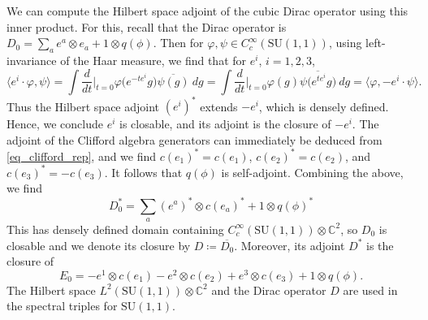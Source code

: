 \documentclass{amsart}
\theoremstyle{definition}
\theoremstyle{remark}
\numberwithin{equation}{section}
\begin{document}
We can compute the Hilbert space adjoint of the cubic Dirac operator using this inner product. For this, recall that the Dirac operator is $D_0=\sum_{a}e^a\otimes e_a+1\otimes q(\phi)$. Then for $\varphi,\psi\in C_c^\infty(\mathrm{SU}(1,1))$, using left-invariance of the Haar measure, we find that for $e^i$, $i=1,2,3$,
\begin{equation*}
    \langle e^i\cdot\varphi,\psi\rangle=\int \frac{d}{dt}\bigg|_{t=0}\varphi\big(e^{-te^i}g\big)\overline{\psi(g)}\ dg=\int\frac{d}{dt}\bigg|_{t=0}\varphi(g)\overline{\psi\big(e^{te^i}g\big)}\ dg=\langle\varphi,-e^i\cdot\psi\rangle.
\end{equation*}
Thus the Hilbert space adjoint $(e^i)^*$ extends $-e^i$, which is densely defined. Hence, we conclude $e^i$ is closable, and its adjoint is the closure of $-e^i$. The adjoint of the Clifford algebra generators can immediately be deduced from \eqref{eq_clifford_rep}, and we find $c(e_1)^*=c(e_1)$, $c(e_2)^*=c(e_2)$, and $c(e_3)^*=-c(e_3)$. It follows that $q(\phi)$ is self-adjoint. Combining the above, we find
\begin{equation*}
    D_0^*=\sum_a (e^a)^*\otimes c(e_a)^*+1\otimes q(\phi)^*
\end{equation*}
This has densely defined domain containing $C_c^\infty(\mathrm{SU}(1,1))\otimes \mathbb{C}^2$, so $D_0$ is closable and we denote its closure by $D\coloneq \overline{D_0}$. Moreover, its adjoint $D^*$ is the closure of
\begin{equation*}
    E_0=-e^1\otimes c(e_1)-e^2\otimes c(e_2)+e^3\otimes c(e_3)+1\otimes q(\phi).
\end{equation*}
The Hilbert space $L^2(\mathrm{SU}(1,1))\otimes\mathbb{C}^2$ and the Dirac operator $D$ are used in the spectral triples for $\mathrm{SU}(1,1)$.
\end{document}
